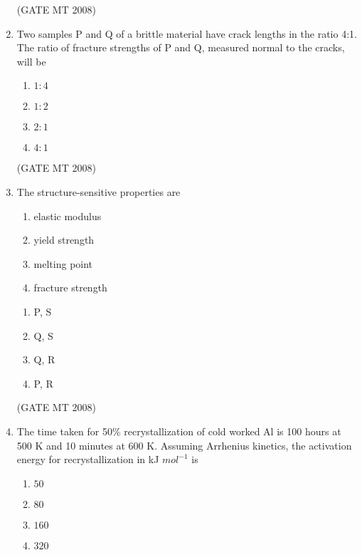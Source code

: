 \documentclass[journal, 11pt, onecolumn]{IEEEtran}
\theoremstyle{remark}
\begin{document}
\begin{enumerate}
\hfill(GATE MT 2008)

\item Two samples P and Q of a brittle material have crack lengths in the ratio 4:1. The ratio of fracture strengths of P and Q, measured normal to the cracks, will be 
\begin{multicols}{4}
\begin{enumerate}
\item $1:4$
\item $1:2$
\item $2:1$
\item $4:1$
\end{enumerate}
\end{multicols}

\hfill(GATE MT 2008)

\item The structure-sensitive properties are
\begin{enumerate}
    \item elastic modulus
    \item yield strength
    \item melting point
    \item fracture strength
\end{enumerate}

\begin{multicols}{4}
\begin{enumerate}
\item P, S
\item Q, S
\item Q, R
\item P, R
\end{enumerate}
\end{multicols}

\hfill(GATE MT 2008)

\item The time taken for 50\% recrystallization of cold worked Al is 100 hours at 500 K and 10 minutes at 600 K. Assuming Arrhenius kinetics, the activation energy for recrystallization in kJ $mol^{-1}$ is

\begin{multicols}{4}
\begin{enumerate}
\item $50$
\item $80$
\item $160$
\item $320$
\end{enumerate}
\end{multicols}


\end{enumerate}
\end{document}
